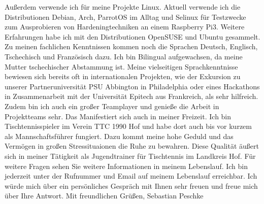 Außerdem verwende ich für meine Projekte Linux. Aktuell verwende ich die Distributionen Debian, Arch, ParrotOS im Alltag und Selinux für Testzwecke zum Ausprobieren von Hardeningtechniken
an einem Raspberry Pi3. Weitere Erfahrungen habe ich mit den Distributionen OpenSUSE und Ubuntu gesammelt. \newline\newline
Zu meinen fachlichen Kenntnissen kommen noch die Sprachen Deutsch, Englisch, Tschechisch und Französisch dazu. Ich bin Bilingual aufgewachsen, da meine Mutter tschechischer Abstammung ist.
Meine vielseitigen Sprachkenntnisse bewiesen sich bereits oft in internationalen Projekten, wie der Exkursion zu unserer Partneruniversität PSU Abbington in Philadelphia oder
eines Hackathons in Zusammenarbeit mit der Universität Epitech aus Frankreich, als sehr hilfreich. \newline\newline
Zudem bin ich auch ein großer Teamplayer und genieße die Arbeit in Projektteams sehr. Das Manifestiert sich auch in meiner Freizeit. Ich bin Tischtennisspieler im Verein TTC 1990 Hof
und habe dort auch bis vor kurzem als Mannschaftsführer fungiert. Dazu kommt meine hohe Geduld und das Vermögen in großen Stressituaionen die Ruhe zu bewahren. Diese Qualität äußert sich
in meiner Tätigkeit als Jugendtrainer für Tischtennis im Landkreis Hof. \newline\newline
Für weitere Fragen sehen Sie weitere Informationen in meinem Lebenslauf. Ich bin jederzeit unter der Rufnummer und Email auf meinem Lebenslauf erreichbar. Ich würde mich über ein
persönliches Gespräch mit Ihnen sehr freuen und freue mich über Ihre Antwort. \newline\newline
\noindent
Mit freundlichen Grüßen,\newline
Sebastian Peschke